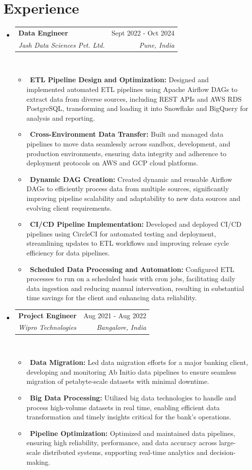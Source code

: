 \documentclass[letterpaper,10.99pt]{article}
\makeatletter
\newcommand{\resumeItem}[1]{\item\small{#1}}
\newcommand{\resumeSubheading}[4]{
\vspace{-1pt}\item
\begin{tabular*}{0.97\textwidth}[t]{l@{\extracolsep{\fill}}r}
\textbf{#1} & #2 \\
\textit{#3} & \textit{#4} \\
\end{tabular*}\vspace{-7pt}
}
\newcommand{\resumeSubHeadingList}{\begin{itemize}[leftmargin=0.10in, label={}]}
\newcommand{\resumeSubHeadingListEnd}{\end{itemize}}
\makeatother
\begin{document}
\begin{minipage}[t]{0.60\textwidth}

    
\section{Experience}
\resumeSubHeadingList
\resumeSubheading
{Data Engineer}{Sept 2022 - Oct 2024}
{Jash Data Sciences Pvt. Ltd.}{Pune, India}\\
\resumeSubHeadingList
\resumeItem{\textbullet\ \textbf{ETL Pipeline Design and Optimization:} Designed and implemented automated ETL pipelines using Apache Airflow DAGs to 
    extract data from diverse sources, including REST APIs and AWS RDS PostgreSQL, transforming 
    and loading it into Snowflake and BigQuery for analysis and reporting.}
\resumeItem{\textbullet\ \textbf{Cross-Environment Data Transfer:} Built and managed data pipelines to move data 
    seamlessly across sandbox, development, and production environments, ensuring data integrity and 
    adherence to deployment protocols on AWS and GCP cloud platforms.}
\resumeItem{\textbullet\ \textbf{Dynamic DAG Creation:} Created dynamic and reusable Airflow DAGs to 
    efficiently process data from multiple sources, significantly improving pipeline 
    scalability and adaptability to new data sources and evolving client requirements.}
\resumeItem{\textbullet\ \textbf{CI/CD Pipeline Implementation:} Developed and deployed CI/CD pipelines 
    using CircleCI for automated testing and deployment, streamlining updates to ETL workflows and 
    improving release cycle efficiency for data pipelines.}
\resumeItem{\textbullet\ \textbf{Scheduled Data Processing and Automation:} Configured ETL processes to run on a 
            scheduled basis with cron jobs, facilitating daily data ingestion and reducing manual intervention, 
            resulting in substantial time savings for the client and enhancing data reliability.}
\resumeSubHeadingListEnd

\resumeSubheading
{Project Engineer}{Aug 2021 - Aug 2022}
{Wipro Technologies}{Bangalore, India}\\
\resumeSubHeadingList
\resumeItem{\textbullet\ \textbf{Data Migration:} Led data migration efforts 
    for a major banking client, developing and monitoring Ab Initio data pipelines to 
    ensure seamless migration of petabyte-scale datasets with minimal downtime.}
\resumeItem{\textbullet\ \textbf{Big Data Processing:} Utilized big data technologies 
    to handle and process high-volume datasets in real time, enabling efficient data 
    transformation and timely insights critical for the bank’s operations.}
\resumeItem{\textbullet\ \textbf{Pipeline Optimization:} Optimized and maintained data pipelines, 
    ensuring high reliability, performance, and data accuracy across large-scale 
    distributed systems, supporting real-time analytics and decision-making.}
\resumeSubHeadingListEnd
\resumeSubHeadingListEnd
\sectionsep


\end{minipage}
\end{document}
